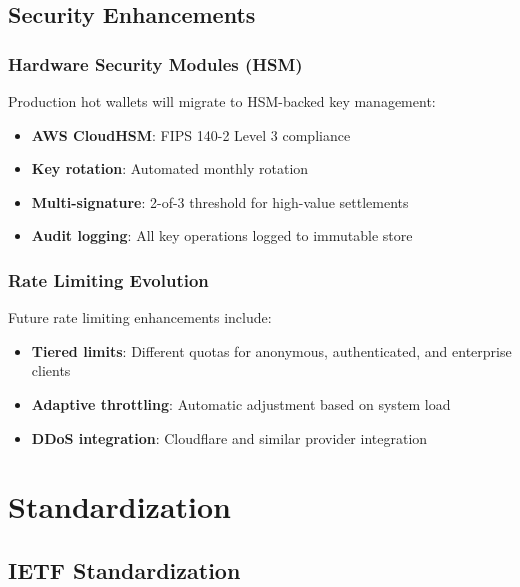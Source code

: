 \subsection{Security Enhancements}

\subsubsection{Hardware Security Modules (HSM)}

Production hot wallets will migrate to HSM-backed key management:

\begin{itemize}
    \item \textbf{AWS CloudHSM}: FIPS 140-2 Level 3 compliance
    \item \textbf{Key rotation}: Automated monthly rotation
    \item \textbf{Multi-signature}: 2-of-3 threshold for high-value settlements
    \item \textbf{Audit logging}: All key operations logged to immutable store
\end{itemize}

\subsubsection{Rate Limiting Evolution}

Future rate limiting enhancements include:
\begin{itemize}
    \item \textbf{Tiered limits}: Different quotas for anonymous, authenticated, and enterprise clients
    \item \textbf{Adaptive throttling}: Automatic adjustment based on system load
    \item \textbf{DDoS integration}: Cloudflare and similar provider integration
\end{itemize}

\section{Standardization}
\label{sec:standardization}

\subsection{IETF Standardization}

